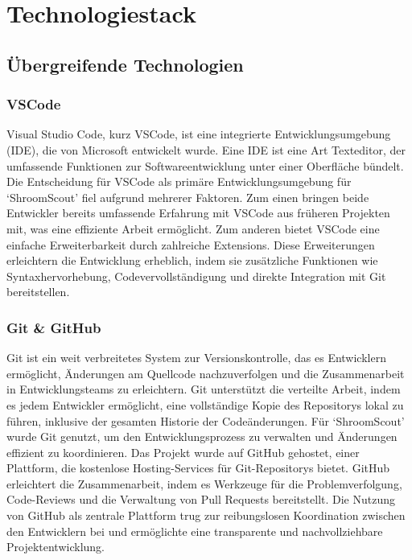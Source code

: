 \section{Technologiestack}

\subsection{Übergreifende Technologien}

\subsubsection{VSCode}

Visual Studio Code, kurz VSCode, ist eine integrierte Entwicklungsumgebung (IDE), die von Microsoft entwickelt wurde. Eine IDE ist eine
Art Texteditor, der umfassende Funktionen zur Softwareentwicklung unter einer Oberfläche bündelt. Die Entscheidung für VSCode als primäre
Entwicklungsumgebung für `ShroomScout' fiel aufgrund mehrerer Faktoren. Zum einen bringen beide Entwickler bereits umfassende Erfahrung
mit VSCode aus früheren Projekten mit, was eine effiziente Arbeit ermöglicht. Zum anderen bietet VSCode eine einfache Erweiterbarkeit durch
zahlreiche Extensions. Diese Erweiterungen erleichtern die Entwicklung erheblich, indem sie zusätzliche Funktionen wie Syntaxhervorhebung,
Codevervollständigung und direkte Integration mit Git bereitstellen.

\subsubsection{Git \& GitHub}

Git ist ein weit verbreitetes System zur Versionskontrolle, das es Entwicklern ermöglicht, Änderungen am Quellcode nachzuverfolgen
und die Zusammenarbeit in Entwicklungsteams zu erleichtern. Git unterstützt die verteilte Arbeit, indem es jedem Entwickler ermöglicht,
eine vollständige Kopie des Repositorys lokal zu führen, inklusive der gesamten Historie der Codeänderungen. Für `ShroomScout' wurde
Git genutzt, um den Entwicklungsprozess zu verwalten und Änderungen effizient zu koordinieren. Das Projekt wurde auf GitHub gehostet,
einer Plattform, die kostenlose Hosting-Services für Git-Repositorys bietet. GitHub erleichtert die Zusammenarbeit, indem es Werkzeuge
für die Problemverfolgung, Code-Reviews und die Verwaltung von Pull Requests bereitstellt. Die Nutzung von GitHub als zentrale Plattform
trug zur reibungslosen Koordination zwischen den Entwicklern bei und ermöglichte eine transparente und nachvollziehbare Projektentwicklung.

